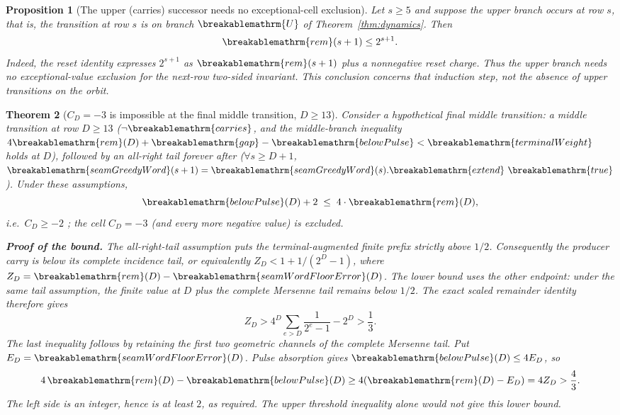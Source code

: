 \documentclass[11pt]{article}
\theoremstyle{plain}
\newtheorem{thm}{Theorem}[section]
\newtheorem{prop}[thm]{Proposition}
\theoremstyle{definition}
\theoremstyle{remark}
\renewcommand{\mathrm}[1]{\ifmmode\breakablemathrm{#1}\else\textrm{#1}\fi}%
\begin{document}
\begin{prop}[The upper (carries) successor needs no exceptional-cell exclusion]
\label{prop:upper-unconditional}
Let $s\ge5$ and suppose the upper branch occurs at row $s$, that is,
the transition at row $s$ is on branch $\mathrm U$ of Theorem~\ref{thm:dynamics}.
Then
\[
  \mathrm{rem}(s+1)\le2^{s+1}.
\]
Indeed, the reset identity expresses $2^{s+1}$ as
$\mathrm{rem}(s+1)$ plus a nonnegative reset charge.
Thus the upper branch needs no exceptional-value exclusion for the
next-row two-sided invariant.  This conclusion concerns that induction
step, not the absence of upper transitions on the orbit.
\end{prop}

\begin{thm}[$C_D=-3$ is impossible at the final middle transition, $D\ge 13$]
\label{thm:cd-neg3-impossible}
Consider a hypothetical \emph{final middle transition}: a middle transition at row $D\ge 13$
($\lnot\mathrm{carries}$, and the middle-branch inequality
$4\mathrm{rem}(D)+\mathrm{gap}-\mathrm{belowPulse} < \mathrm{terminalWeight}$ holds at $D$), followed
by an all-right tail forever after ($\forall s\ge D{+}1$, $\mathrm{seamGreedyWord}(s+1) =
\mathrm{seamGreedyWord}(s).\mathrm{extend}\ \mathrm{true}$). Under these assumptions,
\[
  \mathrm{belowPulse}(D) + 2 \;\le\; 4\cdot\mathrm{rem}(D),
\]
i.e.\ $C_D \ge -2$ ;  the cell $C_D=-3$ (and every more negative value) is excluded.

\textbf{Proof of the bound.} The all-right-tail assumption puts the
terminal-augmented finite prefix strictly above $1/2$.
Consequently the producer carry is below its complete incidence tail,
or equivalently
$Z_D<1+1/(2^D-1)$, where
$Z_D=\mathrm{rem}(D)-\mathrm{seamWordFloorError}(D)$.
The lower bound uses the other endpoint: under the same tail assumption,
the finite value at $D$ plus the complete Mersenne tail remains below
$1/2$.  The exact scaled remainder identity therefore gives
\[
 Z_D>4^D\sum_{e>D}\frac1{2^e-1}-2^D>\frac13.
\]
The last inequality follows by retaining the first two geometric
channels of the complete Mersenne tail.  Put
$E_D=\mathrm{seamWordFloorError}(D)$.  Pulse absorption gives
$\mathrm{belowPulse}(D)\le4E_D$, so
\[
 4\,\mathrm{rem}(D)-\mathrm{belowPulse}(D)
 \ge4(\mathrm{rem}(D)-E_D)=4Z_D>\frac43.
\]
The left side is an integer, hence is at least $2$, as required.
The upper threshold inequality alone would not give this lower bound.


\end{thm}
\end{document}
